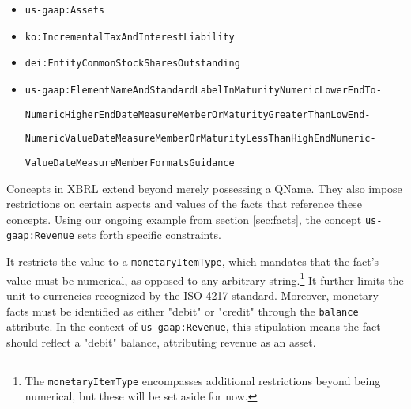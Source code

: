 \begin{itemize}
    \item \texttt{us-gaap:Assets}
    \item \texttt{ko:IncrementalTaxAndInterestLiability}
    \item \texttt{dei:EntityCommonStockSharesOutstanding}
    \item \texttt{us-gaap:ElementNameAndStandardLabelInMaturityNumericLowerEndTo-} 
    
    \texttt{NumericHigherEndDateMeasureMemberOrMaturityGreaterThanLowEnd-}
    
    \texttt{NumericValueDateMeasureMemberOrMaturityLessThanHighEndNumeric-}
    
    \texttt{ValueDateMeasureMemberFormatsGuidance}
\end{itemize}

Concepts in XBRL extend beyond merely possessing a QName.
They also impose restrictions on certain aspects and values of the facts that reference these concepts.
Using our ongoing example from section \ref{sec:facts}, the concept \texttt{us-gaap:Revenue} sets forth specific constraints.

It restricts the value to a \texttt{monetaryItemType},
which mandates that the fact's value must be numerical,
as opposed to any arbitrary string.\footnote{The \texttt{monetaryItemType} encompasses additional restrictions beyond being numerical, but these will be set aside for now.}
It further limits the unit to currencies recognized by the ISO 4217 standard.\cite{eba2018filingrules}
Moreover, monetary facts must be identified as either "debit" or "credit" through the \texttt{balance} attribute.
In the context of \texttt{us-gaap:Revenue}, this stipulation means the fact should reflect a "debit" balance, attributing revenue as an asset.


